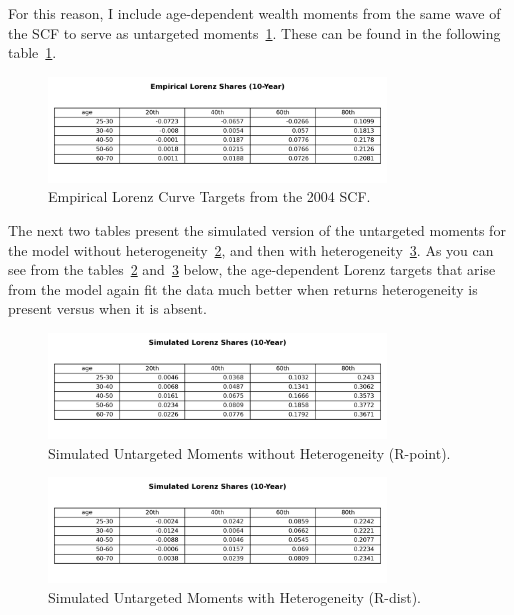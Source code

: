 \par For this reason, I include age-dependent wealth moments from the same wave of the SCF to serve as untargeted moments~\ref{fig:EmpLorenzTar}. These can be found in the following table~\ref{fig:EmpLorenzTar}.

\begin{figure}[h]
\centering
\includegraphics[width=0.8\textwidth]{Tables/Emp_Lorenz_10yr_LCrrDistNetWorth.png}
\caption{Empirical Lorenz Curve Targets from the 2004 SCF.}
\label{fig:EmpLorenzTar}
\end{figure}

\par The next two tables present the simulated version of the untargeted moments for the model without heterogeneity~\ref{fig:SimLorenzTarPoint}, and then with heterogeneity~\ref{fig:SimLorenzTarDist}. As you can see from the tables~\ref{fig:SimLorenzTarPoint} and~\ref{fig:SimLorenzTarDist} below, the age-dependent Lorenz targets that arise from the model again fit the data much better when returns heterogeneity is present versus when it is absent.

\begin{figure}[htbp]
\centering
\includegraphics[width=0.8\textwidth]{Tables/Sim_Lorenz_10yr_LCrrPointNetWorth.png}
\caption{Simulated Untargeted Moments without Heterogeneity (R-point).}
\label{fig:SimLorenzTarPoint}
\end{figure}

\begin{figure}[htbp]
\centering
\includegraphics[width=0.8\textwidth]{Tables/Sim_Lorenz_10yr_LCrrDistNetWorth.png}
\caption{Simulated Untargeted Moments with Heterogeneity (R-dist).}
\label{fig:SimLorenzTarDist}
\end{figure}



\par 





